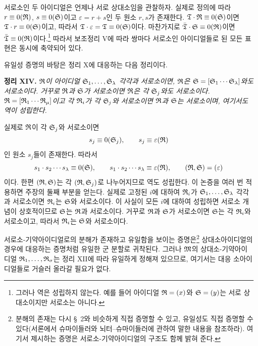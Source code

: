 서로소인 두 아이디얼은 언제나 서로 상대소임을 관찰하자. 실제로 정의에 따라 $r\equiv0(\mathfrak{R})$, $s\equiv0(\mathfrak{S})$이고 $\varepsilon=r+s$인 두 원소 $r,s$가 존재한다. $\mathfrak{T}\cdot\mathfrak{R}\equiv0(\mathfrak{S})$이면 $\mathfrak{T}\cdot r\equiv0(\mathfrak{S})$이고, 따라서 $\mathfrak{T}\cdot\varepsilon=\mathfrak{T}\equiv0(\mathfrak{S})$이다. 마찬가지로 $\bar{\mathfrak{T}}\cdot\mathfrak{S}\equiv0(\mathfrak{R})$이면 $\bar{\mathfrak{T}}\equiv0(\mathfrak{R})$이다.\footnote{그러나 역은 성립하지 않는다. 예를 들어 아이디얼 $\mathfrak{R}=(x)$와 $\mathfrak{S}=(y)$는 서로 상대소이지만 서로소는 아니다.} 따라서 보조정리 V에 따라 쌍마다 서로소인 아이디얼들로 된 모든 표현은 동시에 축약되어 있다.

유일성 증명의 바탕은 정리 X에 대응하는 다음 정리이다.

\textbf{정리 XIV.} \emph{$\mathfrak{R}$이 아이디얼 $\mathfrak{S}_1,\ldots,\mathfrak{S}_\lambda$ 각각과 서로소이면, $\mathfrak{R}$은 $\mathfrak{S}=[\mathfrak{S}_1\cdots\mathfrak{S}_\lambda]$와도 서로소이다. 거꾸로 $\mathfrak{R}$과 $\mathfrak{S}$가 서로소이면 $\mathfrak{R}$은 각 $\mathfrak{S}_j$와도 서로소이다. $\mathfrak{R}=[\mathfrak{R}_1\cdots\mathfrak{R}_\mu]$이고 각 $\mathfrak{R}_i$가 각 $\mathfrak{S}_j$와 서로소이면 $\mathfrak{R}$과 $\mathfrak{S}$는 서로소이며, 여기서도 역이 성립한다.}

실제로 $\mathfrak{R}$이 각 $\mathfrak{S}_j$와 서로소이면
\[
 s_j\equiv0(\mathfrak{S}_j),
 \qquad
 s_j\equiv\varepsilon(\mathfrak{R})
\]
인 원소 $s_j$들이 존재한다. 따라서
\[
 s_1\cdot s_2\cdots s_\lambda\equiv0(\mathfrak{S}),
 \qquad
 s_1\cdot s_2\cdots s_\lambda\equiv\varepsilon(\mathfrak{R}),
 \qquad
 (\mathfrak{R},\mathfrak{S})=(\varepsilon)
\]
이다. 한편 $(\mathfrak{R},\mathfrak{S})$는 각 $(\mathfrak{R},\mathfrak{S}_j)$로 나누어지므로 역도 성립한다. 이 논증을 여러 번 적용하면 주장의 둘째 부분을 얻는다. 실제로 고정된 $i$에 대하여 $\mathfrak{R}_i$가 $\mathfrak{S}_1,\ldots,\mathfrak{S}_\lambda$ 각각과 서로소이면 $\mathfrak{R}_i$는 $\mathfrak{S}$와 서로소이다. 이 사실이 모든 $i$에 대하여 성립하면 서로소 개념이 상호적이므로 $\mathfrak{S}$는 $\mathfrak{R}$과 서로소이다. 거꾸로 $\mathfrak{R}$과 $\mathfrak{S}$가 서로소이면 $\mathfrak{S}$는 각 $\mathfrak{R}_i$와 서로소이고, 따라서 $\mathfrak{R}_i$는 $\mathfrak{S}$와 서로소이다.

서로소-기약아이디얼로의 분해가 존재하고 유일함을 보이는 증명은\footnote{분해의 존재는 다시 \S~2와 비슷하게 직접 증명할 수 있고, 유일성도 직접 증명할 수 있다(서론에서 슈마이들러와 뇌터--슈마이들러에 관하여 말한 내용을 참조하라). 여기서 제시하는 증명은 서로소-기약아이디얼의 구조도 함께 밝혀 준다.} 상대소아이디얼의 경우에 대응하는 증명처럼 유일한 군 분할로 귀착된다. 그러나 $\mathfrak{M}$의 상대소-기약아이디얼 $\mathfrak{R}_1,\ldots,\mathfrak{R}_\sigma$는 정리 XII에 따라 유일하게 정해져 있으므로, 여기서는 대응 소아이디얼들로 거슬러 올라갈 필요가 없다.

